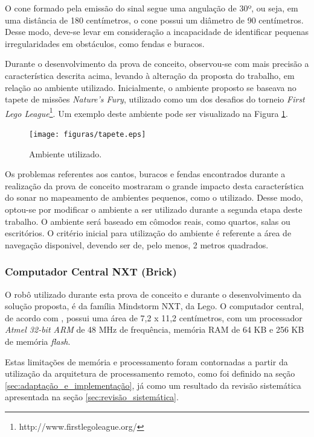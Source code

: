 \begin{itemize}
				O cone formado pela emissão do sinal segue uma angulação de 30º, ou seja, em uma distância de 180 centímetros, o cone possui um diâmetro de 90 centímetros. Desse modo, deve-se levar em consideração a incapacidade de identificar pequenas irregularidades em obstáculos, como fendas e buracos.

				Durante o desenvolvimento da prova de conceito, observou-se com mais precisão a característica descrita acima, levando à alteração da proposta do trabalho, em relação ao ambiente utilizado. Inicialmente, o ambiente proposto se baseava no tapete de missões \textit{Nature's Fury}, utilizado como um dos desafios do torneio \textit{First Lego League}\footnote{http://www.firstlegoleague.org/}. Um exemplo deste ambiente pode ser visualizado na Figura \ref{img:tapete}.

				\begin{figure}[H]
					\centering
					\texttt{[image: figuras/tapete.eps]}
					\caption[Ambiente Proposto Inicialmente]{Ambiente utilizado.}
					\label{img:tapete}
				\end{figure}

				Os problemas referentes aos cantos, buracos e fendas encontrados durante a realização da prova de conceito mostraram o grande impacto desta característica do sonar no mapeamento de ambientes pequenos, como o utilizado. Desse modo, optou-se por modificar o ambiente a ser utilizado durante a segunda etapa deste trabalho. O ambiente será baseado em cômodos reais, como quartos, salas ou escritórios. O critério inicial para utilização do ambiente é referente a área de navegação disponivel, devendo ser de, pelo menos, 2 metros quadrados.

		\end{itemize}

		\subsubsection{Computador Central NXT (Brick)} %
		\label{sub:brick}

			O robô utilizado durante esta prova de conceito e durante o desenvolvimento da solução proposta, é da família Mindstorm NXT, da Lego. O computador central, de acordo com \cite{legonxj}, possui uma área de 7,2 x 11,2 centímetros, com um processador \textit{Atmel 32-bit ARM} de 48 MHz de frequência, memória RAM de 64 KB e 256 KB de memória \textit{flash}.

			Estas limitações de memória e processamento foram contornadas a partir da utilização da arquitetura de processamento remoto, como foi definido na seção \ref{sec:adaptação_e_implementação}, já como um resultado da revisão sistemática apresentada na seção \ref{sec:revisão_sistemática}.
